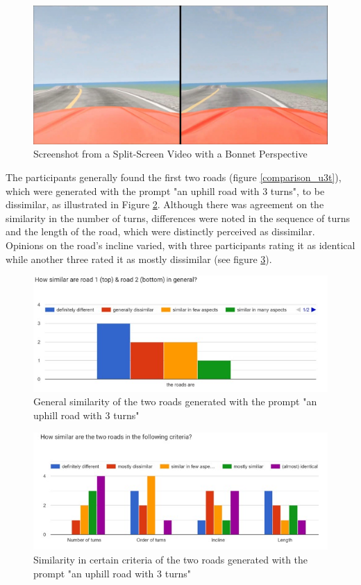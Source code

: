 \begin{figure}[H]
    \centering
    \includegraphics[width=0.75\linewidth]{images/splitscreen_bonnet_view.jpg}
    \caption{Screenshot from a Split-Screen Video with a Bonnet Perspective}
    \label{splitscreen-bonnet}
\end{figure}


The participants generally found the first two roads (figure \ref{comparison_u3t}), which were generated with the prompt "an uphill road with 3 turns",  to be dissimilar, as illustrated in Figure \ref{general_similarity_uphill_road}. Although there was agreement on the similarity in the number of turns, differences were noted in the sequence of turns and the length of the road, which were distinctly perceived as dissimilar. Opinions on the road's incline varied, with three participants rating it as identical while another three rated it as mostly dissimilar (see figure \ref{specific_similarity_uphill_road}).


\begin{figure}[H]
    \centering
    \includegraphics[width=0.75\linewidth]{images/similarity_a_road.jpg}
    \caption{General similarity of the two roads generated with the prompt "an uphill road with 3 turns"}
    \label{general_similarity_uphill_road}
\end{figure}

\begin{figure}[H]
    \centering
    \includegraphics[width=0.75\linewidth]{images/similarity_a_road_specific.jpg}
    \caption{Similarity in certain criteria of the two roads generated with the prompt "an uphill road with 3 turns"}
    \label{specific_similarity_uphill_road}
\end{figure}


